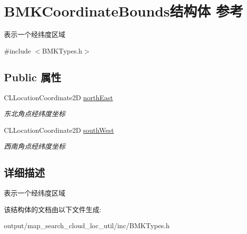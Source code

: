 \hypertarget{struct_b_m_k_coordinate_bounds}{\section{B\+M\+K\+Coordinate\+Bounds结构体 参考}
\label{struct_b_m_k_coordinate_bounds}
}


表示一个经纬度区域  




{\ttfamily \#include $<$B\+M\+K\+Types.\+h$>$}

\subsection*{Public 属性}
\begin{DoxyCompactItemize}
\item 
\hypertarget{struct_b_m_k_coordinate_bounds_a0ebf42cb8682f2a6990fc7c6e439702e}{C\+L\+Location\+Coordinate2\+D \hyperlink{struct_b_m_k_coordinate_bounds_a0ebf42cb8682f2a6990fc7c6e439702e}{north\+East}}\label{struct_b_m_k_coordinate_bounds_a0ebf42cb8682f2a6990fc7c6e439702e}

\begin{DoxyCompactList}\small\item\em 东北角点经纬度坐标 \end{DoxyCompactList}\item 
\hypertarget{struct_b_m_k_coordinate_bounds_afd02c24b2ffe5aba18a125a48cdd1c37}{C\+L\+Location\+Coordinate2\+D \hyperlink{struct_b_m_k_coordinate_bounds_afd02c24b2ffe5aba18a125a48cdd1c37}{south\+West}}\label{struct_b_m_k_coordinate_bounds_afd02c24b2ffe5aba18a125a48cdd1c37}

\begin{DoxyCompactList}\small\item\em 西南角点经纬度坐标 \end{DoxyCompactList}\end{DoxyCompactItemize}


\subsection{详细描述}
表示一个经纬度区域 

该结构体的文档由以下文件生成\+:\begin{DoxyCompactItemize}
\item 
output/map\+\_\+search\+\_\+cloud\+\_\+loc\+\_\+util/inc/B\+M\+K\+Types.\+h\end{DoxyCompactItemize}
